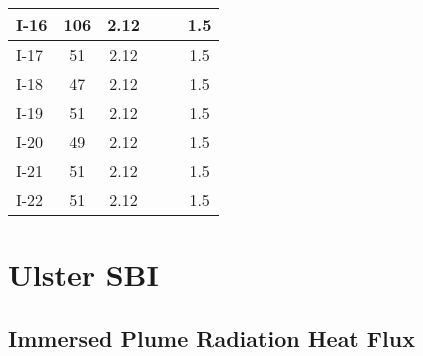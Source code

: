 \begin{table}[!h]
\begin{center}
\begin{tabular}{|l|c|c||l|c|c|}
I-16       &  106              &  2.12      &            &                   &  1.5       \\ \hline
I-17       &  51               &  2.12      &            &                   &  1.5       \\ \hline
I-18       &  47               &  2.12      &            &                   &  1.5       \\ \hline
I-19       &  51               &  2.12      &            &                   &  1.5       \\ \hline
I-20       &  49               &  2.12      &            &                   &  1.5       \\ \hline
I-21       &  51               &  2.12      &            &                   &  1.5       \\ \hline
I-22       &  51               &  2.12      &            &                   &  1.5       \\ \hline
\end{tabular}
\end{center}
\end{table}


\clearpage


\section{Ulster SBI}

\subsection*{Immersed Plume Radiation Heat Flux}

